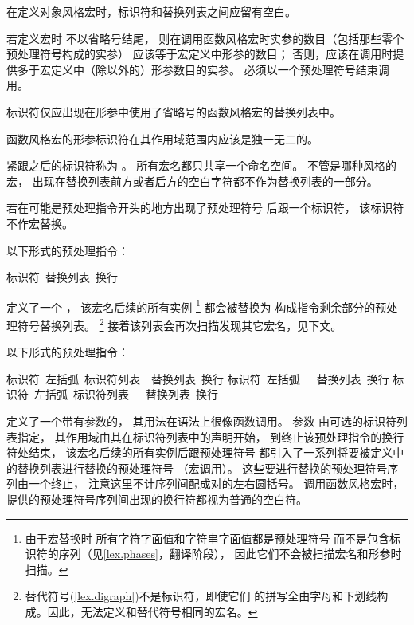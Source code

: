 \pnum
{}%
在定义对象风格宏时，标识符和替换列表之间应留有空白。

\pnum
若定义宏时
不以省略号结尾，
则在调用函数风格宏时实参的数目（包括那些零个预处理符号构成的实参）
应该等于宏定义中形参的数目；
否则，应该在调用时提供多于宏定义中（除以外的）形参数目的实参。
必须以一个预处理符号\tcode{)}结束调用。

\pnum
{}%
标识符仅应出现在形参中使用了省略号的函数风格宏的替换列表中。

\pnum
函数风格宏的形参标识符在其作用域范围内应该是独一无二的。

\pnum
紧跟之后的标识符称为
%
%
。
所有宏名都只共享一个命名空间。
不管是哪种风格的宏，
出现在替换列表前方或者后方的空白字符都不作为替换列表的一部分。

\pnum
若在可能是预处理指令开头的地方出现了预处理符号
\tcode{\#}
后跟一个标识符，
该标识符不作宏替换。

\pnum
以下形式的预处理指令：

\begin{ncsimplebnf}
 标识符~替换列表~换行
%
\end{ncsimplebnf}

定义了一个
%
，
该宏名后续的所有实例
\footnote{由于宏替换时
	所有字符字面值和字符串字面值都是预处理符号
	而不是包含标识符的序列（见\ref{lex.phases}，翻译阶段），
	因此它们不会被扫描宏名和形参时扫描。}
都会被替换为
构成指令剩余部分的预处理符号替换列表。
\footnote{替代符号(\ref{lex.digraph})不是标识符，即使它们
	的拼写全由字母和下划线构成。因此，无法定义和替代符号相同的宏名。}
接着该列表会再次扫描发现其它宏名，见下文。

\pnum
以下形式的预处理指令：

\begin{ncsimplebnf}
 标识符~左括弧~标识符列表\opt{}~\terminal{)}~替换列表~换行\br
{} 标识符~左括弧~~\terminal{)}~替换列表~换行\br
{} 标识符~左括弧~标识符列表~~\terminal{)}~替换列表~换行\br
\end{ncsimplebnf}

%
定义了一个带有参数的，
其用法在语法上很像函数调用。
参数
%
由可选的标识符列表指定，
其作用域由其在标识符列表中的声明开始，
到终止该预处理指令的换行符处结束，
该宏名后续的所有实例后跟预处理符号\tcode{(}
都引入了一系列将要被定义中的替换列表进行替换的预处理符号
（宏调用）。
%
这些要进行替换的预处理符号序列由一个\tcode{)}终止，
注意这里不计序列间配成对的左右圆括号。
调用函数风格宏时，提供的预处理符号序列间出现的换行符都视为普通的空白符。

